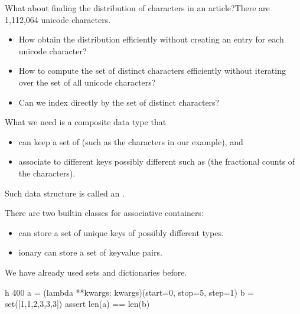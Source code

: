 \documentclass[letterpaper,10pt,english]{sphinxmanual}
\begin{document}
What about finding the distribution of characters in an article?There are 1,112,064 unicode characters.
\begin{itemize}
\item {} 
How obtain the distribution efficiently without creating an entry for each unicode character?

\item {} 
How to compute the set of distinct characters efficiently without iterating over the set of all unicode characters?

\item {} 
Can we index  directly by the set of distinct characters?

\end{itemize}

What we need is a composite data type that
\begin{itemize}
\item {} 
can keep a set of  (such as the characters in our example), and

\item {} 
associate to different keys possibly different  such as (the fractional counts of the characters).

\end{itemize}

Such data structure is called an .


There are two built\sphinxhyphen{}in classes for associative containers:
\begin{itemize}
\item {} 
 can store a set of unique keys of possibly different types.

\item {} 
ionary can store a set of key\sphinxhyphen{}value pairs.

\end{itemize}

We have already used sets and dictionaries before.

\begin{sphinxVerbatim}[commandchars=\\\{\}]
 \PYGZhy{}h 400
a = (lambda **kwargs: kwargs)(start=0, stop=5, step=1)
b = set([1,1,2,3,3,3])
assert len(a) == len(b)
\end{sphinxVerbatim}
\end{document}
